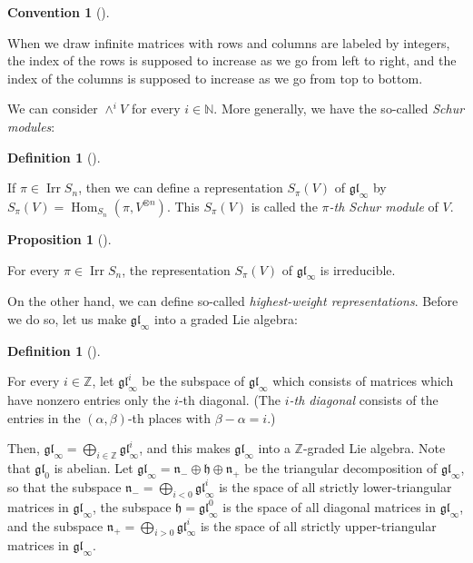 \documentclass
[numbers=enddot,12pt,final,onecolumn,german,notitlepage]{scrartcl}%
\theoremstyle{definition}
\newtheorem{prop}[theo]{Proposition}
\newenvironment{proposition}[1][]
{\begin{prop}[#1]\begin{leftbar}}
{\end{leftbar}\end{prop}}
\newtheorem{defi}[theo]{Definition}
\newenvironment{definition}[1][]
{\begin{defi}[#1]\begin{leftbar}}
{\end{leftbar}\end{defi}}
\newtheorem{conv}[theo]{Convention}
\newenvironment{Convention}[1][]
{\begin{conv}[#1]\begin{leftbar}}
{\end{leftbar}\end{conv}}
\begin{document}
\begin{Convention}
When we draw infinite matrices with rows and columns are labeled by integers,
the index of the rows is supposed to increase as we go from left to right, and
the index of the columns is supposed to increase as we go from top to bottom.
\end{Convention}

We can consider $\wedge^{i}V$ for every $i\in\mathbb{N}$. More generally, we
have the so-called \textit{Schur modules}:

\begin{definition}
If $\pi\in\operatorname*{Irr}S_{n}$, then we can define a representation
$S_{\pi}\left(  V\right)  $ of $\mathfrak{gl}_{\infty}$ by $S_{\pi}\left(
V\right)  =\operatorname*{Hom}\nolimits_{S_{n}}\left(  \pi,V^{\otimes
n}\right)  $. This $S_{\pi}\left(  V\right)  $ is called the $\pi$\textit{-th
Schur module} of $V$.
\end{definition}

\begin{proposition}
For every $\pi\in\operatorname*{Irr}S_{n}$, the representation $S_{\pi}\left(
V\right)  $ of $\mathfrak{gl}_{\infty}$ is irreducible.
\end{proposition}

On the other hand, we can define so-called \textit{highest-weight
representations}. Before we do so, let us make $\mathfrak{gl}_{\infty}$ into a
graded Lie algebra:

\begin{definition}
For every $i\in\mathbb{Z}$, let $\mathfrak{gl}_{\infty}^{i}$ be the subspace
of $\mathfrak{gl}_{\infty}$ which consists of matrices which have nonzero
entries only the $i$-th diagonal. (The $i$\textit{-th diagonal} consists of
the entries in the $\left(  \alpha,\beta\right)  $-th places with
$\beta-\alpha=i$.)

Then, $\mathfrak{gl}_{\infty}=\bigoplus\limits_{i\in\mathbb{Z}}\mathfrak{gl}%
_{\infty}^{i}$, and this makes $\mathfrak{gl}_{\infty}$ into a $\mathbb{Z}%
$-graded Lie algebra. Note that $\mathfrak{gl}_{0}$ is abelian. Let
$\mathfrak{gl}_{\infty}=\mathfrak{n}_{-}\oplus\mathfrak{h}\oplus
\mathfrak{n}_{+}$ be the triangular decomposition of $\mathfrak{gl}_{\infty}$,
so that the subspace $\mathfrak{n}_{-}=\bigoplus\limits_{i<0}\mathfrak{gl}%
_{\infty}^{i}$ is the space of all strictly lower-triangular matrices in
$\mathfrak{gl}_{\infty}$, the subspace $\mathfrak{h}=\mathfrak{gl}_{\infty
}^{0}$ is the space of all diagonal matrices in $\mathfrak{gl}_{\infty}$, and
the subspace $\mathfrak{n}_{+}=\bigoplus\limits_{i>0}\mathfrak{gl}_{\infty
}^{i}$ is the space of all strictly upper-triangular matrices in
$\mathfrak{gl}_{\infty}$.
\end{definition}
\end{document}
